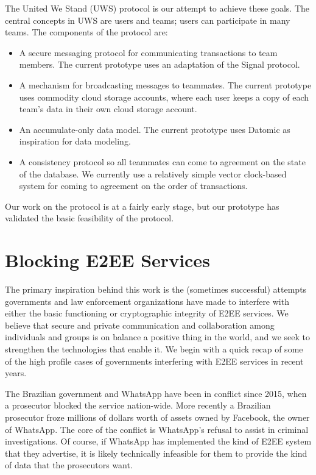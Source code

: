 \documentclass{sig-alternate-hotpets}
\begin{document}
The United We Stand (UWS) protocol is our attempt to achieve these goals.
The central concepts in UWS are users and teams; users can participate in many teams.
The components of the protocol are:

\begin{itemize}
\item A secure messaging protocol for communicating transactions to team members.
  The current prototype uses an adaptation of the Signal protocol.
\item A mechanism for broadcasting messages to teammates.
  The current prototype uses commodity cloud storage accounts, where each user keeps a copy of each team's data in their own cloud storage account.
\item An accumulate-only data model.
  The current prototype uses Datomic as inspiration for data modeling.
\item A consistency protocol so all teammates can come to agreement on the state of the database.
  We currently use a relatively simple vector clock-based system for coming to agreement on the order of transactions.
\end{itemize}

Our work on the protocol is at a fairly early stage, but our prototype has validated the basic feasibility of the protocol.

\section{Blocking E2EE Services}

The primary inspiration behind this work is the (sometimes successful) attempts governments and law enforcement organizations have made to interfere with either the basic functioning or cryptographic integrity of E2EE services.
We believe that secure and private communication and collaboration among individuals and groups is on balance a positive thing in the world, and we seek to strengthen the technologies that enable it.
We begin with a quick recap of some of the high profile cases of governments interfering with E2EE services in recent years.

The Brazilian government and WhatsApp have been in conflict since 2015, when a prosecutor blocked the service nation-wide.
More recently a Brazilian prosecutor froze millions of dollars worth of assets owned by Facebook, the owner of WhatsApp.
The core of the conflict is WhatsApp's refusal to assist in criminal investigations.
Of course, if WhatsApp has implemented the kind of E2EE system that they advertise, it is likely technically infeasible for them to provide the kind of data that the prosecutors want.
\end{document}
